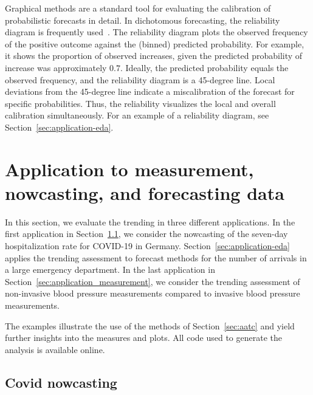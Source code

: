 \documentclass[pdflatex]{sn-jnl}
\theoremstyle{plain}%
\theoremstyle{definition}
\begin{document}
Graphical methods are a standard tool for evaluating the calibration of probabilistic forecasts in detail.
In dichotomous forecasting, the reliability diagram is frequently used~\citep{Ranjan2010}.
The reliability diagram plots the observed frequency of the positive outcome against the (binned) predicted probability.
For example, it shows the proportion of observed increases, given the predicted probability of increase was approximately $0.7$.
Ideally, the predicted probability equals the observed frequency, and the reliability diagram is a 45-degree line.
Local deviations from the 45-degree line indicate a miscalibration of the forecast for specific probabilities.
Thus, the reliability visualizes the local and overall calibration simultaneously.
For an example of a reliability diagram, see Section~\ref{sec:application-eda}.

\section{Application to measurement, nowcasting, and forecasting data} \label{sec:application}

In this section, we evaluate the trending in three different applications.
In the first application in Section~\ref{sec:application-covid}, we consider the nowcasting of the seven-day hospitalization rate for COVID-19 in Germany.
Section~\ref{sec:application-eda} applies the trending assessment to forecast methods for the number of arrivals in a large emergency department.
In the last application in Section~\ref{sec:application_measurement}, we consider the trending assessment of non-invasive blood pressure measurements compared to invasive blood pressure measurements.

The examples illustrate the use of the methods of Section~\ref{sec:aatc} and yield further insights into the measures and plots.
All code used to generate the analysis is available online.


\subsection{Covid nowcasting} \label{sec:application-covid}
\end{document}
